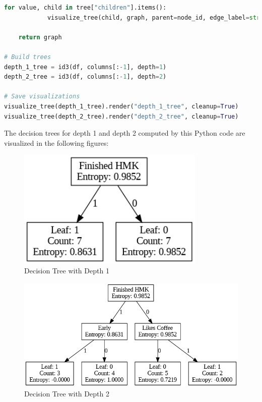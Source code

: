 \documentclass[12pt,letterpaper, onecolumn]{exam}
\begin{document}
\begin{questions}
\begin{parts}
\begin{solution}
\begin{lstlisting}[language=Python, style=mystyle]
        for value, child in tree["children"].items():
            visualize_tree(child, graph, parent=node_id, edge_label=str(value))

    return graph

# Build trees
depth_1_tree = id3(df, columns[:-1], depth=1)
depth_2_tree = id3(df, columns[:-1], depth=2)

# Save visualizations
visualize_tree(depth_1_tree).render("depth_1_tree", cleanup=True)
visualize_tree(depth_2_tree).render("depth_2_tree", cleanup=True)
        \end{lstlisting}

        The decision trees for depth 1 and depth 2 computed by this Python code 
        are visualized in the following figures:

        
        \begin{figure}[H]
            \begin{center}
                \begin{minipage}{0.85\textwidth}
                        \centering
                        \includegraphics[width=0.8\textwidth]{depth_1_tree.png}
                        \caption{Decision Tree with Depth 1}
                \end{minipage}
            \end{center}
        \end{figure}
        

        \begin{figure}[H]
            \begin{minipage}{\textwidth} 
                \centering
                \includegraphics[width=\textwidth]{depth_2_tree.png}
                \caption{Decision Tree with Depth 2}
            \end{minipage}
        \end{figure}


\end{solution}
\end{parts}
\end{questions}
\end{document}
